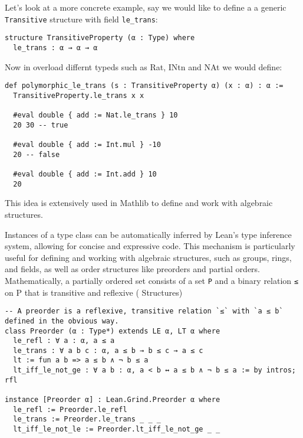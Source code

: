 Let's look at a more concrete example, say we would like to define a a generic \lstinline[language=lean]|Transitive| 
structure with field \lstinline[language=lean]|le_trans|:
\begin{lstlisting}[language=lean]
structure TransitiveProperty (α : Type) where
  le_trans : α → α → α
\end{lstlisting}
Now in overload differnt typeds such as Rat, INtn and NAt we would define:
\begin{lstlisting}[language=lean]
  def polymorphic_le_trans (s : TransitiveProperty α) (x : α) : α :=
  TransitiveProperty.le_trans x x

  #eval double { add := Nat.le_trans } 10
  20 30 -- true

  #eval double { add := Int.mul } -10
  20 -- false

  #eval double { add := Int.add } 10
  20
\end{lstlisting}

This idea is extensively used in Mathlib to define and work with algebraic structures.

Instances of a type class can be automatically inferred by Lean's type inference system,
allowing for concise and expressive code.
This mechanism is particularly useful for defining and working with algebraic structures,
such as groups, rings, and fields, as well as order structures like preorders and partial orders.
Mathematically, a partially ordered set consists of a set \lstinline[language=lean]|P| 
and a binary relation 
\lstinline[language=lean]|≤| 
on P that is transitive and reflexive (\cite{mathinlean} Structures)

\begin{lstlisting}[language=lean, caption=Preorder Type Class in Lean]
-- A preorder is a reflexive, transitive relation `≤` with `a ≤ b` defined in the obvious way.
class Preorder (α : Type*) extends LE α, LT α where
  le_refl : ∀ a : α, a ≤ a
  le_trans : ∀ a b c : α, a ≤ b → b ≤ c → a ≤ c
  lt := fun a b => a ≤ b ∧ ¬ b ≤ a
  lt_iff_le_not_ge : ∀ a b : α, a < b ↔ a ≤ b ∧ ¬ b ≤ a := by intros; rfl

instance [Preorder α] : Lean.Grind.Preorder α where
  le_refl := Preorder.le_refl
  le_trans := Preorder.le_trans _ _ _
  lt_iff_le_not_le := Preorder.lt_iff_le_not_ge _ _
\end{lstlisting}

